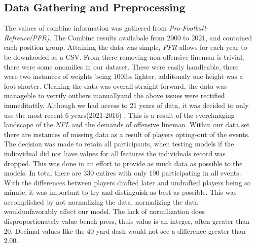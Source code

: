 \documentclass[confrence]{IEEEtran}
\begin{document}
\subsection*{Data Gathering and Preprocessing}
The values of combine information was gathered from \textit{Pro-Football-Refrence(PFR)}.
The Combine results availabale from 2000 to 2021, and contained each position group.
Attaining the data was simple, \textit{PFR} allows for each year to be downlaoded as a CSV.
From there removing non-offensive lineman is trivial, there were some anomilies in our dataset.
These were easily handleable, there were two instances of weights being 100lbs lighter, additonaly one height was a foot shorter.
Cleaning the data was overall straight forward, the data was manageble to verrify outliers manuallyand the above issues were rectified immeditattly.
Although we had access to 21 years of data, it was decided to only use the most recent 6 years(2021-2016) . This is a result of the everchnaging landscape of the \textit{NFL} and the demands of offensive lineman. 
Within our data set there are instances of missing data as a result of players opting-out of the events. 
The decision was made to retain all participants, when testing models if the indiovidual did not have values for all features the individuals record was dropped.
This was done in an effort to provide as much data as possible to the models. In total there are 330 entires with only 190 participating in all events.
With the differences between players drafted later and undrafted players being so minute, it was important to try and distinguish as best as possible. 
This was accomplished by not normalizing the data, normalizing the data wouldunfavorably affect our model.
The lack of normilization does disproportionately value bench press, thuis value is an integer, often greater than 20, Decimal values like the 40 yard dash would not see a difference greater than 2.00.
\end{document}
